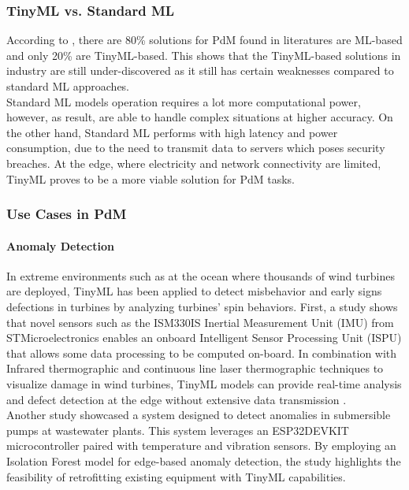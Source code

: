 \documentclass[twocolumn]{article}
\begin{document}
\subsubsection{TinyML vs. Standard ML}

According to \cite{achouch_predictive_2022,zonta_predictive_2020}, there are 80\% solutions for PdM found in literatures are ML-based and only 20\% are TinyML-based. This shows that the TinyML-based solutions in industry are still under-discovered as it still has certain weaknesses compared to standard ML approaches.\\[0.1cm]

Standard ML models operation requires a lot more computational power, however, as result, are able to handle complex situations at higher accuracy. On the other hand, Standard ML performs with high latency and power consumption, due to the need to transmit data to servers which poses security breaches. At the edge, where electricity and network connectivity are limited, TinyML proves to be a more viable solution for PdM tasks. 

\subsubsection{Use Cases in PdM}

\paragraph{Anomaly Detection}

In extreme environments such as at the ocean where thousands of wind turbines are deployed, TinyML has been applied to detect misbehavior and early signs defections in turbines by analyzing turbines' spin behaviors. First, a study shows that novel sensors such as the ISM330IS Inertial Measurement Unit (IMU) from STMicroelectronics enables an onboard Intelligent Sensor Processing Unit (ISPU) that allows some data processing to be computed on-board. In combination with Infrared thermographic and continuous line laser thermographic techniques to visualize damage in wind turbines, TinyML models can provide real-time analysis and defect detection at the edge without extensive data transmission \cite{rabbi_novel_nodate}. \\[0.1cm]

Another study showcased a system designed to detect anomalies in submersible pumps at wastewater plants. This system leverages an ESP32DEVKIT microcontroller paired with temperature and vibration sensors. By employing an Isolation Forest model for edge-based anomaly detection, the study highlights the feasibility of retrofitting existing equipment with TinyML capabilities.\cite{antonini_tinyml_2022}\\[0.1cm]
\end{document}
